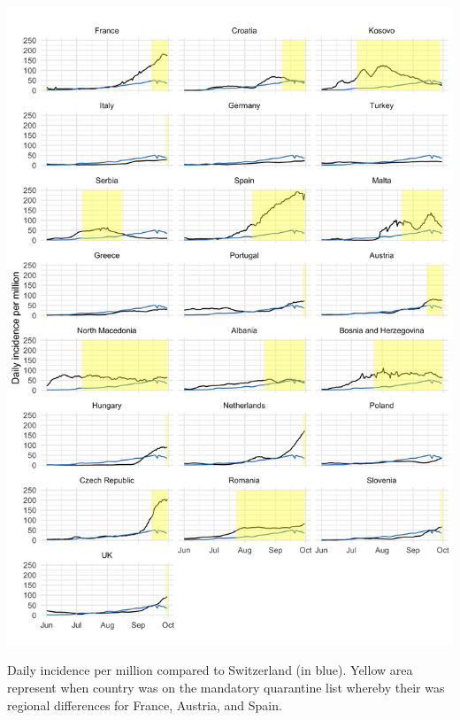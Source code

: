 \documentclass[10pt, a4paper, twoside]{article}
\begin{document}
\clearpage
\begin{suppfigure}[h]
\centering
\includegraphics[scale=0.125]{SF1_2021-06-02.png}
\caption{Daily incidence per million compared to Switzerland (in blue). Yellow area represent when country was on the mandatory quarantine list whereby their was regional differences for France, Austria, and Spain.}
\label{sf1}
\end{suppfigure}
\end{document}
